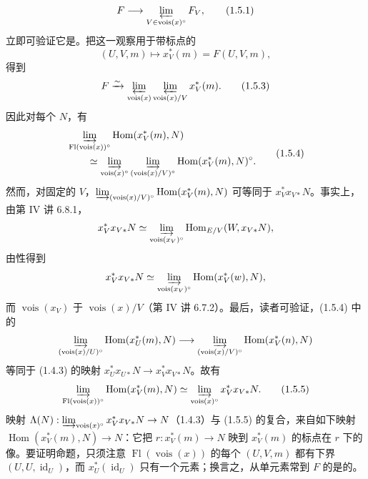 \[
 F\longrightarrow\varprojlim_{V\in\operatorname{vois}(x)^\circ}F_V,\tag{1.5.1}
\]
立即可验证它是。把这一观察用于带标点的
\[
 (U,V,m)\longmapsto x_V^*(m)=F(U,V,m),\tag{1.5.2}
\]
得到
\[
 F\xrightarrow{\sim}\varprojlim_{\operatorname{vois}(x)}
 \varprojlim_{\operatorname{vois}(x)/V}x_V^*(m).\tag{1.5.3}
\]
因此对每个 $N$，有
\[
\begin{split}
 &\varinjlim_{\operatorname{Fl}(\operatorname{vois}(x))^\circ}
 \operatorname{Hom}(x_V^*(m),N)\\
 &\qquad\simeq\varinjlim_{\operatorname{vois}(x)^\circ}
 \varinjlim_{(\operatorname{vois}(x)/V)^\circ}
 \operatorname{Hom}(x_V^*(m),N)^\circ.
\end{split}\tag{1.5.4}
\]
然而，对固定的 $V$，$\varinjlim_{(\operatorname{vois}(x)/V)^\circ}\operatorname{Hom}(x_V^*(m),N)$ 可等同于 $x_V^*x_{V*}N$。事实上，由第 IV 讲 6.8.1，
\[
 x_V^*x_{V*}N\simeq\varinjlim_{\operatorname{vois}(x_V)^\circ}
 \operatorname{Hom}_{E/V}(W,x_{V*}N),
\]
由性得到
\[
 x_V^*x_{V*}N\simeq\varinjlim_{\operatorname{vois}(x_V)^\circ}
 \operatorname{Hom}(x_V^*(w),N),
\]
而 $\operatorname{vois}(x_V)$ 于 $\operatorname{vois}(x)/V$（第 IV 讲 6.7.2）。最后，读者可验证，(1.5.4) 中的
\[
 \varinjlim_{(\operatorname{vois}(x)/U)^\circ}\operatorname{Hom}(x_U^*(m),N)
 \longrightarrow\varinjlim_{(\operatorname{vois}(x)/V)^\circ}\operatorname{Hom}(x_V^*(n),N)
\]
等同于 (1.4.3) 的映射 $x_U^*x_{U*}N\to x_V^*x_{V*}N$。故有
\[
 \varinjlim_{\operatorname{Fl}(\operatorname{vois}(x))^\circ}\operatorname{Hom}(x_V^*(m),N)
 \simeq\varinjlim_{\operatorname{vois}(x)^\circ}x_V^*x_{V*}N.\tag{1.5.5}
\]
映射 $\Lambda(N):\varinjlim_{\operatorname{vois}(x)^\circ}x_V^*x_{V*}N\to N$（1.4.3）与 (1.5.5) 的复合，来自如下映射
$\operatorname{Hom}(x_V^*(m),N)\to N$：它把 $r:x_V^*(m)\to N$ 映到 $x_V^*(m)$ 的标点在 $r$ 下的像。要证明命题，只须注意 $\operatorname{Fl}(\operatorname{vois}(x))$ 的每个 $(U,V,m)$ 都有下界 $(U,U,\operatorname{id}_U)$，而 $x_U^*(\operatorname{id}_U)$ 只有一个元素；换言之，从单元素常到 $F$ 的是的。

